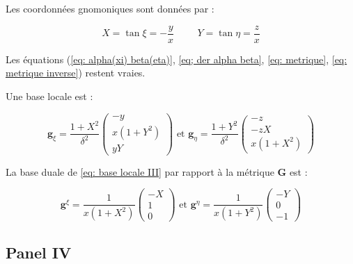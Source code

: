Les coordonnées gnomoniques sont données par :

\begin{equation}
X = \tan \xi = - \dfrac{y}{x} \hspace{1cm} Y = \tan \eta = \dfrac{z}{x}
\end{equation}

Les équations (\ref{eq: alpha(xi) beta(eta)}, \ref{eq; der alpha beta}, \ref{eq: metrique}, \ref{eq: metrique inverse}) restent vraies. 

Une base locale est :

\begin{equation}
\mathbf{g}_{\xi} = \dfrac{1+X^2}{\delta^2} \begin{pmatrix}
-y \\ x(1+Y^2) \\ yY
\end{pmatrix} \text{ et } \mathbf{g}_{\eta} = \dfrac{1+Y^2}{\delta^2} \begin{pmatrix}
-z \\ -zX \\ x(1+X^2)
\end{pmatrix}
\label{eq: base locale III}
\end{equation}

La base duale de \eqref{eq: base locale III} par rapport à la métrique $\mathbf{G}$ est :

\begin{equation}
\mathbf{g}^{\xi} = \dfrac{1}{x(1+X^2)}\begin{pmatrix}
-X \\ 1 \\ 0
\end{pmatrix} \text{ et } \mathbf{g}^{\eta} = \dfrac{1}{x(1+Y^2)}\begin{pmatrix}
-Y \\ 0 \\ -1
\end{pmatrix}
\label{eq: base duale III}
\end{equation}
















\subsection{Panel IV}

